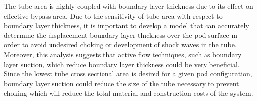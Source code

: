 The tube area is highly coupled with boundary layer thickness due to its effect on effective bypass area. Due to the sensitivity of tube area with respect to boundary layer thickness, it is important to develop a model that can accurately determine the displacement boundary layer thickness over the pod surface in order to avoid undesired choking or development of shock waves in the tube. Moreover, this analysis suggests that active flow techniques, such as boundary layer suction, which reduce boundary layer thickness could be very beneficial. Since the lowest tube cross sectional area is desired for a given pod configuration, boundary layer suction could reduce the size of the tube necessary to prevent choking which will reduce the total material and construction costs of the system.
